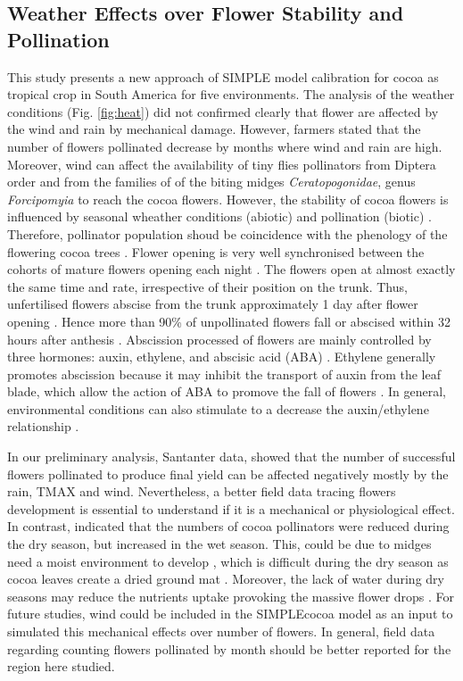 \documentclass[gene,journal,article,submit,moreauthors,pdftex]{Definitions/mdpi}
\begin{document}
\subsection{Weather Effects over Flower Stability and Pollination}
This study presents a new approach of SIMPLE model calibration for cocoa as tropical crop in South America for five environments. The analysis of the weather conditions (Fig. \ref{fig:heat}) did not confirmed clearly that flower are affected by the wind and rain by mechanical damage. However, farmers stated that the number of flowers pollinated decrease by months where wind and rain are high. Moreover, wind can affect the availability of tiny flies pollinators from Diptera order and from the families of of the biting midges \textit{Ceratopogonidae},  genus  \textit{Forcipomyia} \citep{Saunders1959, kaufmann1975, sotomayor2020} to reach the cocoa flowers. However, the stability of cocoa flowers is influenced by seasonal wheather conditions (abiotic) and pollination (biotic) \citep{Frimpong2014}. Therefore, pollinator population shoud be coincidence with the phenology of the flowering cocoa trees \citep{Young1983, Young2012}. Flower opening is very well synchronised between the cohorts of mature flowers opening each night \citep{Niemenak2010}. The flowers open at almost exactly the same time and rate, irrespective of their position on the trunk. Thus, unfertilised flowers abscise from the trunk approximately 1 day after flower opening  \citep{Niemenak2010}. Hence more than 90\% of unpollinated flowers fall or abscised within 32 hours after  anthesis \citep{Aneja1999}. Abscission processed of  flowers are mainly controlled  by  three  hormones: auxin, ethylene, and abscisic acid (ABA) \citep{Aneja1999}. Ethylene generally promotes abscission because it may  inhibit the transport of auxin from the leaf blade, which allow the action of ABA to promove the fall of flowers \citep{Beyer1975}. In general, environmental conditions can also  stimulate   to  a  decrease  the  auxin/ethylene relationship \citep{Aneja1999}.

In our preliminary analysis, Santanter data, showed that the number of successful flowers pollinated to produce final yield can be affected negatively mostly by the rain, TMAX and wind. Nevertheless, a better field data tracing flowers development is essential to understand if it is a mechanical or physiological effect. In contrast,  \cite{Frimpong2009, Frimpong2011} indicated that the numbers of cocoa pollinators were reduced during the dry season, but increased in the wet season. This, could be due to midges need a moist environment to develop \citep{Frimpong2014}, which is difficult during the dry season as cocoa leaves create a dried ground mat \citep{Frimpong2009, Frimpong2014}. Moreover, the lack of water during dry seasons may reduce the nutrients uptake provoking the massive flower drops \citep{Vaughton2017}.  For future studies, wind could be included in the SIMPLEcocoa model as an input to simulated this mechanical effects over number of flowers. In general, field data regarding counting flowers pollinated by month should be better reported for the region here studied. 
\end{document}
